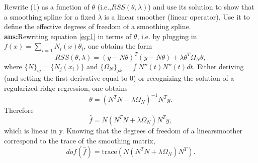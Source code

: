 \documentclass[a4paper, norsk, 8pt]{article}
\begin{document}
\begin{multicols*}{2}
\begin{equation}
\end{equation}
Rewrite (1) as a function of $\theta$ (i.e.,$RSS(\theta,\lambda)$) and use its solution to show that a smoothing spline for a fixed $\lambda$ is a linear smoother (linear operator). Use it to define the effective degrees of freedom of a smoothing spline.\\
\textbf{ans:}Rewriting equation \ref{eq:1} in terms of $\theta$, i.e. by plugging in $f(x)=\sum_{i=1}N_i(x)\theta_i$, one obtains the form
\begin{equation}
	RSS(\theta, \lambda) = (y-N\theta)^T(y-N\theta) + \lambda \theta^T \Omega_N \theta,
\end{equation}
where $\{N\}_{ij}=\{N_j(x_i)\}$ and $\{\Omega_N\}_{jk}=\int N''(t)N''(t)dt$. Either deriving (and setting the first derivative equal to 0) or recognizing the solution of a regularized ridge regression, one obtains
\begin{equation}
	\theta = (N^TN + \lambda \Omega_N)^{-1} N^Ty.
\end{equation}
Therefore
\begin{equation}
	\hat{f} = N(N^TN + \lambda \Omega_N) N^Ty,
\end{equation}
which is linear in y. Knowing that the degrees of freedom of a linearsmoother correspond to the trace of the smoothing matrix,
\begin{equation}
	dof(\hat{f}) = \text{trace}(N(N^TN + \lambda \Omega_N)N^T).
\end{equation}

\end{multicols*}
\end{document}
